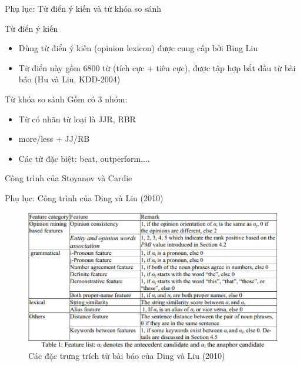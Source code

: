 \documentclass[9pt,xcolor=table,hyperref=unicode]{beamer}
\begin{document}
		\begin{frame}{Phụ lục: Từ điển ý kiến và từ khóa so sánh}
			\begin{block}{Từ điển ý kiến}
				\begin{itemize}
					\item Dùng từ điển ý kiến (opinion lexicon) được cung cấp bởi Bing Liu \footnotemark
					\item Từ điển này gồm 6800 từ (tích cực + tiêu cực), được tập hợp bắt đầu từ bài báo (Hu và Liu, KDD-2004)
				\end{itemize}
			\end{block}
			\begin{block}{Từ khóa so sánh}
				Gồm có 3 nhóm:
				\begin{itemize}
					\item Từ có nhãn từ loại là JJR, RBR
					\item more/less + JJ/RB
					\item Các từ đặc biệt: beat, outperform,...
				\end{itemize}
			\end{block}
		\end{frame}

		\begin{frame}{Công trình của Stoyanov và Cardie}
		\end{frame}

		\begin{frame}{Phụ lục: Công trình của Ding và Liu (2010)}
			\begin{figure}[H]
				\centering							
				\includegraphics[scale=0.45]{images/base_features}				
				\caption{Các đặc trưng trích từ bài báo của Ding và Liu (2010)}				
			\end{figure}
		\end{frame}
\end{document}
